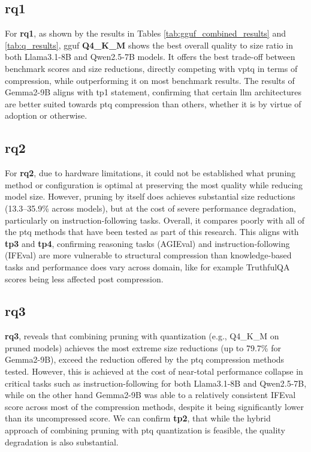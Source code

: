 \documentclass{ifacconf}
\begin{document}
	\subsection{\gls{rq}1}
	For \textbf{\gls{rq}1}, as shown by the results in Tables \ref{tab:gguf_combined_results} and \ref{tab:q_results}, \gls{gguf} \textbf{Q4\_K\_M} shows the best overall quality to size ratio in both Llama3.1-8B and Qwen2.5-7B models. It offers the best trade-off between benchmark scores and size reductions, directly competing with \gls{vptq} in terms of compression, while outperforming it on most benchmark results. The results of Gemma2-9B aligns with \gls{tp}1 statement, confirming that certain \gls{llm} architectures are better suited towards \gls{ptq} compression than others, whether it is by virtue of adoption or otherwise. 
	
	\subsection{\gls{rq}2}
	For \textbf{\gls{rq}2}, due to hardware limitations, it could not be established what pruning method or configuration is optimal at preserving the most quality while reducing model size. However, pruning by itself does achieves substantial size reductions (13.3--35.9\% across models), but at the cost of severe performance degradation, particularly on instruction-following tasks. Overall, it compares poorly with all of the \gls{ptq} methods that have been tested as part of this research. This aligns with \textbf{\gls{tp}3} and \textbf{\gls{tp}4}, confirming reasoning tasks (AGIEval) and instruction-following (IFEval) are more vulnerable to structural compression than knowledge-based tasks and performance does vary across domain, like for example TruthfulQA scores being less affected post compression.
	
	\subsection{\gls{rq}3}
	\textbf{\gls{rq}3}, reveals that combining pruning with quantization (e.g., Q4\_K\_M on pruned models) achieves the most extreme size reductions (up to 79.7\% for Gemma2-9B), exceed the reduction offered by the \gls{ptq} compression methods tested. However, this is achieved at the cost of near-total performance collapse in critical tasks such as instruction-following for both Llama3.1-8B and Qwen2.5-7B, while on the other hand Gemma2-9B was able to a relatively consistent IFEval score across most of the compression methods, despite it being significantly lower than its uncompressed score. We can confirm \textbf{\gls{tp}2}, that while the hybrid approach of combining pruning with \gls{ptq} quantization is feasible, the quality degradation is also substantial. 
	
\end{document}
